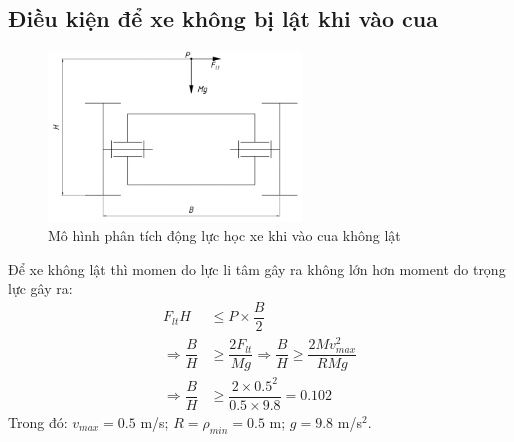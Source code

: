         \subsection{Điều kiện để xe không bị lật khi vào cua}
            \begin{figure}[H]
                \centering
                \includegraphics[width=0.6\textwidth]{pictures/chapter3/c3_p2_TurningAnalysis.png}
                \caption{Mô hình phân tích động lực học xe khi vào cua không lật}
                \label{fig:3.2}
            \end{figure}
            \hspace*{0.6cm}Để xe không lật thì momen do lực li tâm gây ra không lớn hơn moment do trọng lực gây ra:
            \begin{align}
                F_{lt}H &\leq P \times \dfrac{B}{2} \label{eq:3.5} \\
                \Rightarrow \dfrac{B}{H} &\geq \dfrac{2F_{lt}}{Mg} \Rightarrow \dfrac{B}{H} \geq \dfrac{2Mv_{max}^2}{RMg} \nonumber \\ 
                \Rightarrow \dfrac{B}{H} &\geq \dfrac{2 \times 0.5^2}{0.5 \times 9.8} = 0.102  \nonumber
            \end{align}
            \hspace*{0.6cm}Trong đó: $v_{max} = 0.5$ m/s; $R = \rho_{min} = 0.5$ m; $g = 9.8$ m/s$^2$.
